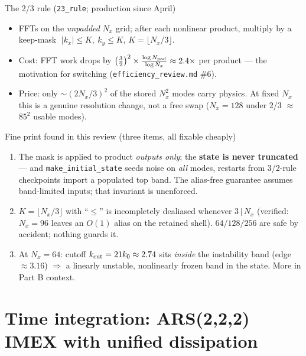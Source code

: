 \documentclass[aspectratio=169,10pt]{beamer}
\newcommand{\file}[1]{\textcolor{blue!60!black}{\texttt{#1}}}
\begin{document}
\begin{frame}{The 2/3 rule (\texttt{23\_rule}; production since April)}
  \begin{itemize}
    \item FFTs on the \emph{unpadded} $N_x$ grid; after each nonlinear product,
      multiply by a keep-mask
      $\;|k_x|\le K,\ k_y\le K$, $K = \lfloor N_x/3\rfloor$.
    \item Cost: FFT work drops by $\bigl(\tfrac{3}{2}\bigr)^2\times\frac{\log N_{\rm pad}}{\log N_x}
      \approx 2.4\times$ per product --- the motivation for switching
      (\file{efficiency\_review.md} \#6).
    \item Price: only $\sim(2N_x/3)^2$ of the stored $N_x^2$ modes carry physics.
      At fixed $N_x$ this is a genuine resolution change, not a free swap
      ($N_x{=}128$ under 2/3 $\approx$ $85^2$ usable modes).
  \end{itemize}
  \begin{alertblock}{Fine print found in this review (three items, all fixable cheaply)}
    \begin{enumerate}\small
      \item The mask is applied to product \emph{outputs only}; the \textbf{state is never
        truncated} --- and \texttt{make\_initial\_state} seeds noise on \emph{all} modes,
        restarts from 3/2-rule checkpoints import a populated top band. The alias-free
        guarantee assumes band-limited inputs; that invariant is unenforced.
      \item $K=\lfloor N_x/3\rfloor$ with ``$\le$'' is incompletely dealiased whenever
        $3\,|\,N_x$ (verified: $N_x{=}96$ leaves an $O(1)$ alias on the retained shell).
        $64/128/256$ are safe by accident; nothing guards it.
      \item At $N_x{=}64$: cutoff $k_{\rm cut}=21k_0\approx2.74$ sits \emph{inside} the
        instability band (edge $\approx3.16$) $\Rightarrow$ a linearly unstable,
        nonlinearly frozen band in the state. More in Part B context.
    \end{enumerate}
  \end{alertblock}
\end{frame}

\section{Time integration: ARS(2,2,2) IMEX with unified dissipation}
\end{document}
